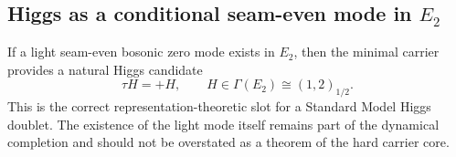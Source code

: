 \subsection{Higgs as a conditional seam-even mode in \texorpdfstring{$E_2$}{E2}}

If a light seam-even bosonic zero mode exists in $E_2$, then the minimal carrier provides a natural Higgs candidate
\[
\tau H = +H,
\qquad
H\in \Gamma(E_2)\cong (1,2)_{1/2}.
\]
This is the correct representation-theoretic slot for a Standard Model Higgs doublet. The existence of the light mode itself remains part of the dynamical completion and should not be overstated as a theorem of the hard carrier core.

